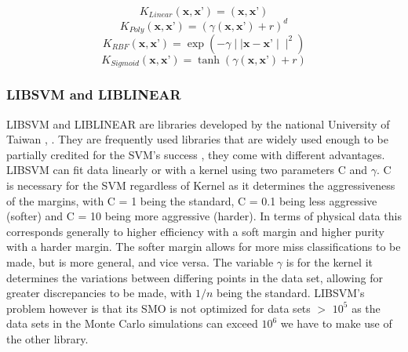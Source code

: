 \documentclass[12pt,a4paper]{article}
\begin{document}
\begin{equation}
K_{Linear}(\textbf{x},\textbf{x'})= (\textbf{x},\textbf{x'})
\label{linear_K_equation}
\end{equation}
\begin{equation}
K_{Poly}(\textbf{x},\textbf{x'}) =  (\gamma(\textbf{x},\textbf{x'})+r)^d 
\label{poly_K_equation}
\end{equation}
\begin{equation}
K_{RBF}(\textbf{x},\textbf{x'}) =  \exp{(-\gamma \mid \mid \textbf{x} - \textbf{x'}  \mid \mid ^2)}
\label{rbf_K_equation}
\end{equation}
\begin{equation}
K_{Sigmoid}(\textbf{x},\textbf{x'}) =  \tanh{(\gamma(\textbf{x},\textbf{x'})+ r)} 
\label{sigmoid_K_equation}
\end{equation}

\subsubsection{LIBSVM and LIBLINEAR}
LIBSVM and LIBLINEAR are libraries developed by the national University of Taiwan \cite{libsvm_paper}, \cite{liblinear_paper}. They are frequently used libraries that are widely used enough to be partially credited for the SVM's success \cite{svm_book}, they come with different advantages. \\

LIBSVM can fit data linearly or with a kernel using two parameters C and $\gamma$. C is necessary for the SVM regardless of Kernel as it determines the aggressiveness of the margins, with C = 1 being the standard, C = 0.1 being less aggressive (softer) and C = 10 being more aggressive (harder). In terms of physical data this corresponds generally to higher efficiency with a soft margin and higher purity with a harder margin. The softer margin allows for more miss classifications to be made, but is more general, and vice versa. The variable $\gamma$ is for the kernel it determines the variations between differing points in the data set, allowing for greater discrepancies to be made, with $1/n$ being the standard. LIBSVM's problem however is that its SMO is not optimized for data sets $>$ $10^5$ as the data sets in the Monte Carlo simulations can exceed $10^6$ we have to make use of the other library. \\
\end{document}

